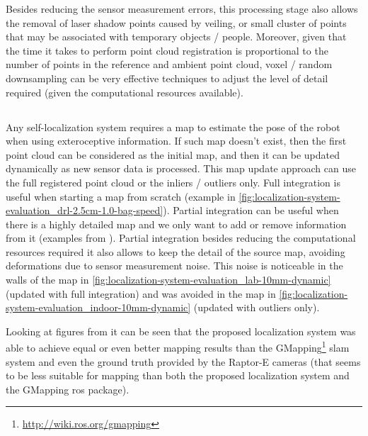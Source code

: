Besides reducing the sensor measurement errors, this processing stage also allows the removal of laser shadow points caused by veiling, or small cluster of points that may be associated with temporary objects / people. Moreover, given that the time it takes to perform point cloud registration is proportional to the number of points in the reference and ambient point cloud, voxel / random downsampling can be very effective techniques to adjust the level of detail required (given the computational resources available).



\subsection{}

Any self-localization system requires a map to estimate the pose of the robot when using exteroceptive information. If such map doesn't exist, then the first point cloud can be considered as the initial map, and then it can be updated dynamically as new sensor data is processed. This map update approach can use the full registered point cloud or the inliers / outliers only. Full integration is useful when starting a map from scratch (example in \cref{fig:localization-system-evaluation_drl-2.5cm-1.0-bag-speed}). Partial integration can be useful when there is a highly detailed map and we only want to add or remove information from it (examples from ). Partial integration besides reducing the computational resources required it also allows to keep the detail of the source map, avoiding deformations due to sensor measurement noise. This noise is noticeable in the walls of the map in \cref{fig:localization-system-evaluation_lab-10mm-dynamic} (updated with full integration) and was avoided in the map in \cref{fig:localization-system-evaluation_indoor-10mm-dynamic} (updated with outliers only).

Looking at figures from  it can be seen that the proposed localization system was able to achieve equal or even better mapping results than the GMapping\footnote{\url{http://wiki.ros.org/gmapping}} \gls{slam} system and even the ground truth provided by the Raptor-E cameras (that seems to be less suitable for mapping than both the proposed localization system and the GMapping \gls{ros} package).


